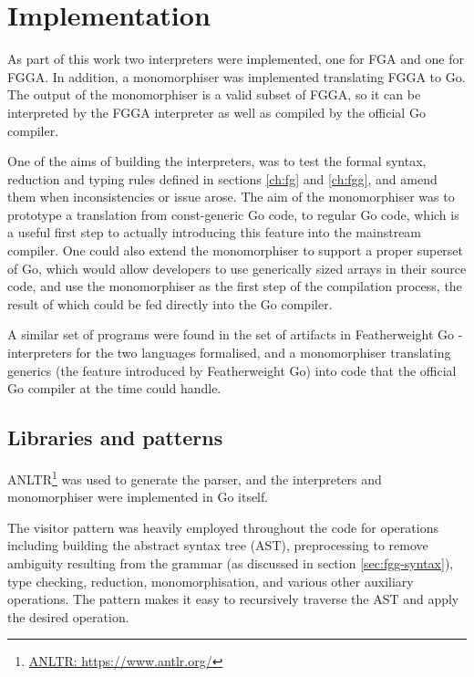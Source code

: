 \section{Implementation}
\label{ch:interpter-impl}

As part of this work two interpreters were implemented, one for FGA and one for
FGGA. In addition, a monomorphiser was implemented translating FGGA to Go. The
output of the monomorphiser is a valid subset of FGGA, so it can be interpreted
by the FGGA interpreter as well as compiled by the official Go compiler.

One of the aims of building the interpreters, was to test the formal syntax,
reduction and typing rules defined in sections \ref{ch:fg} and \ref{ch:fgg}, and
amend them when inconsistencies or issue arose. The aim of the monomorphiser was
to prototype a translation from const-generic Go code, to regular Go code, which
is a useful first step to actually introducing this feature into the mainstream
compiler. One could also extend the monomorphiser to support a proper superset
of Go, which would allow developers to use generically sized arrays in their
source code, and use the monomorphiser as the first step of the compilation
process, the result of which could be fed directly into the Go compiler.

A similar set of programs were found in the set of artifacts in Featherweight Go
\autocite{fg} - interpreters for the two languages formalised, and a
monomorphiser translating generics (the feature introduced by Featherweight Go)
into code that the official Go compiler at the time could handle.

\subsection{Libraries and patterns}

ANLTR\footnote{\href{https://www.antlr.org/}{ANLTR: https://www.antlr.org/}} was
used to generate the parser, and the interpreters and monomorphiser were
implemented in Go itself.

The visitor pattern was heavily employed throughout the code for operations
including building the abstract syntax tree (AST), preprocessing to remove
ambiguity resulting from the grammar (as discussed in section
\ref{sec:fgg-syntax}), type checking, reduction, monomorphisation, and various
other auxiliary operations. The pattern makes it easy to recursively traverse
the AST and apply the desired operation.


